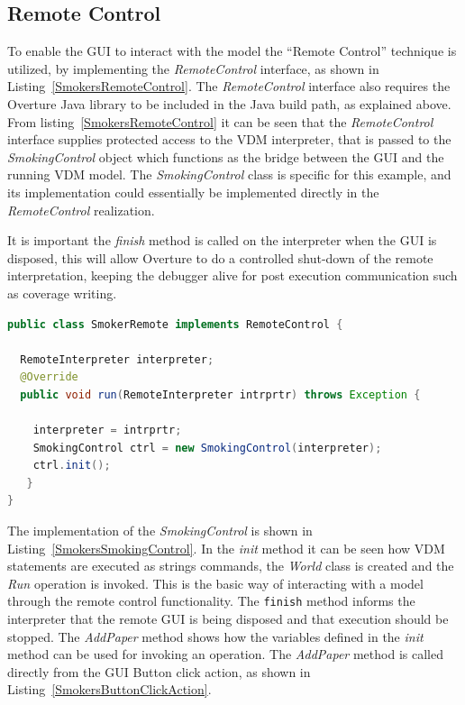 \documentclass{overturerepchap}
\begin{document}
\newpage
\subsection{Remote Control}
To enable the GUI to interact with the model the ``Remote Control'' technique is utilized, by implementing the \textit{RemoteControl} interface, as shown in Listing~\ref{SmokersRemoteControl}. The \textit{RemoteControl} interface also requires the Overture Java library to be included in the Java build path, as explained above. From listing~\ref{SmokersRemoteControl} it can be seen that the \textit{RemoteControl} interface supplies protected access to the VDM interpreter, that is passed to the \textit{SmokingControl} object which functions as the bridge between the GUI and the running VDM model. The \textit{SmokingControl} class is specific for this example, and its implementation could essentially be implemented directly in the \textit{RemoteControl} realization.

It is important the \textit{finish} method is called on the interpreter when the GUI is disposed, this will allow Overture to do a controlled shut-down of the remote interpretation, keeping the debugger alive for post execution communication such as coverage writing.

\begin{lstlisting}[language=Java,label=SmokersRemoteControl,caption=Java implementation of the RemoteControl interface, captionpos=b]
public class SmokerRemote implements RemoteControl {

  RemoteInterpreter interpreter;
  @Override
  public void run(RemoteInterpreter intrprtr) throws Exception {
	
    interpreter = intrprtr;
    SmokingControl ctrl = new SmokingControl(interpreter);
    ctrl.init();
   }
}
\end{lstlisting}

The implementation of the \textit{SmokingControl} is shown in Listing~\ref{SmokersSmokingControl}. In the \textit{init} method it can be seen how VDM statements are executed as strings commands, the \textit{World} class is created and the \textit{Run} operation is invoked.  This is the basic way of interacting with a model through the remote control functionality. The \texttt{finish} method informs the interpreter that the remote GUI is being disposed and that execution should be stopped. The \textit{AddPaper} method shows how the variables defined in the \textit{init} method can be used for invoking an operation. The \textit{AddPaper} method is called directly from the GUI Button click action, as shown in Listing~\ref{SmokersButtonClickAction}.
\end{document}
